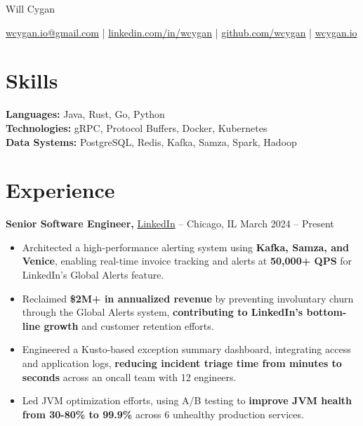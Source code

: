 \documentclass[11pt]{article}
\begin{document}
\centerline{\Huge Will Cygan}

\vspace{5pt}

\centerline{\href{mailto:wcygan.io@gmail.com}{wcygan.io@gmail.com} | \href{https://linkedin.com/in/wcygan}{linkedin.com/in/wcygan} | \href{https://github.com/wcygan}{github.com/wcygan} | \href{https://www.wcygan.io}{wcygan.io}}

\vspace{-10pt}

\section*{Skills}
\textbf{Languages:} Java, Rust, Go, Python \\
\textbf{Technologies:} gRPC, Protocol Buffers, Docker, Kubernetes \\
\textbf{Data Systems:} PostgreSQL, Redis, Kafka, Samza, Spark, Hadoop

\vspace{-6.5pt}

\section*{Experience}
\textbf{Senior Software Engineer,} \href{https://www.linkedin.com/}{LinkedIn} -- Chicago, IL \hfill March 2024 -- Present \\
\vspace{-9pt}
\begin{itemize}
  \item Architected a high-performance alerting system using \textbf{Kafka, Samza, and Venice}, enabling real-time invoice tracking and alerts at \textbf{50,000+ QPS} for LinkedIn's Global Alerts feature.
  \item Reclaimed \textbf{\$2M+ in annualized revenue} by preventing involuntary churn through the Global Alerts system, \textbf{contributing to LinkedIn's bottom-line growth} and customer retention efforts.
  \item Engineered a Kusto-based exception summary dashboard, integrating access and application logs, \textbf{reducing incident triage time from minutes to seconds} across an oncall team with 12 engineers.
  \item Led JVM optimization efforts, using A/B testing to \textbf{improve JVM health from 30-80\% to 99.9\%} across 6 unhealthy production services.
\end{itemize}
\end{document}
